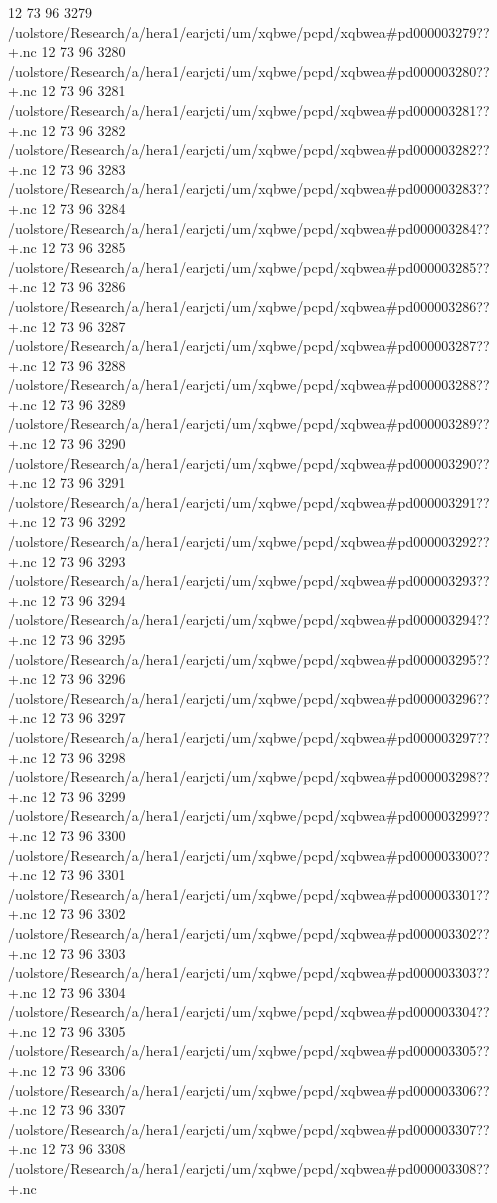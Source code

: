 12 73 96
3279
/uolstore/Research/a/hera1/earjcti/um/xqbwe/pcpd/xqbwea#pd000003279??+.nc
12 73 96
3280
/uolstore/Research/a/hera1/earjcti/um/xqbwe/pcpd/xqbwea#pd000003280??+.nc
12 73 96
3281
/uolstore/Research/a/hera1/earjcti/um/xqbwe/pcpd/xqbwea#pd000003281??+.nc
12 73 96
3282
/uolstore/Research/a/hera1/earjcti/um/xqbwe/pcpd/xqbwea#pd000003282??+.nc
12 73 96
3283
/uolstore/Research/a/hera1/earjcti/um/xqbwe/pcpd/xqbwea#pd000003283??+.nc
12 73 96
3284
/uolstore/Research/a/hera1/earjcti/um/xqbwe/pcpd/xqbwea#pd000003284??+.nc
12 73 96
3285
/uolstore/Research/a/hera1/earjcti/um/xqbwe/pcpd/xqbwea#pd000003285??+.nc
12 73 96
3286
/uolstore/Research/a/hera1/earjcti/um/xqbwe/pcpd/xqbwea#pd000003286??+.nc
12 73 96
3287
/uolstore/Research/a/hera1/earjcti/um/xqbwe/pcpd/xqbwea#pd000003287??+.nc
12 73 96
3288
/uolstore/Research/a/hera1/earjcti/um/xqbwe/pcpd/xqbwea#pd000003288??+.nc
12 73 96
3289
/uolstore/Research/a/hera1/earjcti/um/xqbwe/pcpd/xqbwea#pd000003289??+.nc
12 73 96
3290
/uolstore/Research/a/hera1/earjcti/um/xqbwe/pcpd/xqbwea#pd000003290??+.nc
12 73 96
3291
/uolstore/Research/a/hera1/earjcti/um/xqbwe/pcpd/xqbwea#pd000003291??+.nc
12 73 96
3292
/uolstore/Research/a/hera1/earjcti/um/xqbwe/pcpd/xqbwea#pd000003292??+.nc
12 73 96
3293
/uolstore/Research/a/hera1/earjcti/um/xqbwe/pcpd/xqbwea#pd000003293??+.nc
12 73 96
3294
/uolstore/Research/a/hera1/earjcti/um/xqbwe/pcpd/xqbwea#pd000003294??+.nc
12 73 96
3295
/uolstore/Research/a/hera1/earjcti/um/xqbwe/pcpd/xqbwea#pd000003295??+.nc
12 73 96
3296
/uolstore/Research/a/hera1/earjcti/um/xqbwe/pcpd/xqbwea#pd000003296??+.nc
12 73 96
3297
/uolstore/Research/a/hera1/earjcti/um/xqbwe/pcpd/xqbwea#pd000003297??+.nc
12 73 96
3298
/uolstore/Research/a/hera1/earjcti/um/xqbwe/pcpd/xqbwea#pd000003298??+.nc
12 73 96
3299
/uolstore/Research/a/hera1/earjcti/um/xqbwe/pcpd/xqbwea#pd000003299??+.nc
12 73 96
3300
/uolstore/Research/a/hera1/earjcti/um/xqbwe/pcpd/xqbwea#pd000003300??+.nc
12 73 96
3301
/uolstore/Research/a/hera1/earjcti/um/xqbwe/pcpd/xqbwea#pd000003301??+.nc
12 73 96
3302
/uolstore/Research/a/hera1/earjcti/um/xqbwe/pcpd/xqbwea#pd000003302??+.nc
12 73 96
3303
/uolstore/Research/a/hera1/earjcti/um/xqbwe/pcpd/xqbwea#pd000003303??+.nc
12 73 96
3304
/uolstore/Research/a/hera1/earjcti/um/xqbwe/pcpd/xqbwea#pd000003304??+.nc
12 73 96
3305
/uolstore/Research/a/hera1/earjcti/um/xqbwe/pcpd/xqbwea#pd000003305??+.nc
12 73 96
3306
/uolstore/Research/a/hera1/earjcti/um/xqbwe/pcpd/xqbwea#pd000003306??+.nc
12 73 96
3307
/uolstore/Research/a/hera1/earjcti/um/xqbwe/pcpd/xqbwea#pd000003307??+.nc
12 73 96
3308
/uolstore/Research/a/hera1/earjcti/um/xqbwe/pcpd/xqbwea#pd000003308??+.nc
